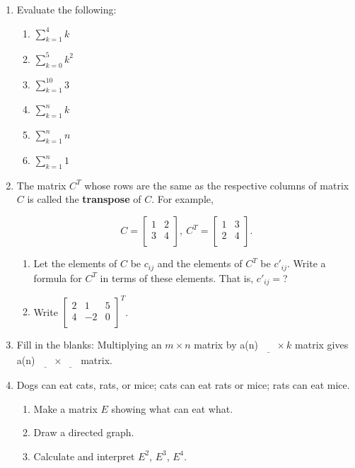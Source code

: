 \documentclass[../gatm.tex]{subfiles}
\begin{document}
\begin{enumerate}
\setcounter{enumi}{\value{mtrx_mult_problem_i}}
\item Evaluate the following:
\begin{multicols}{6}
\begin{enumerate}
\item $\displaystyle\sum_{k=1}^4 k$
\item $\displaystyle\sum_{k=0}^5 k^2$
\item $\displaystyle\sum_{k=1}^{10} 3$
\item $\displaystyle\sum_{k=1}^n k$
\item $\displaystyle\sum_{k=1}^n n$
\item $\displaystyle\sum_{k=1}^n 1$
\end{enumerate}
\end{multicols}

\item The matrix $C^T$ whose rows are the same as the respective columns of matrix $C$ is called the \textbf{transpose} of $C$. For example,

$$C=\left[\begin{array}{cc}
1 & 2 \\
3 & 4 \\
\end{array}\right],\: C^T=\left[\begin{array}{cc}
1 & 3 \\
2 & 4 \\
\end{array}\right].$$

\begin{enumerate}
\item Let the elements of $C$ be $c_{ij}$ and the elements of $C^T$ be $c'_{ij}$. Write a formula for $C^T$ in terms of these elements. That is, $c'_{ij} = $?
\item Write $\left[\begin{array}{ccc}
2 & 1 & 5 \\
4 & -2 & 0 \\
\end{array}\right]^T$.
\end{enumerate}
\item Fill in the blanks: Multiplying an $m\times n$ matrix by a(n) $\underline{\phantom{egg}} \times k$ matrix gives a(n) $\underline{\phantom{egg}}\times\underline{\phantom{egg}}$ matrix.
\item Dogs can eat cats, rats, or mice; cats can eat rats or mice; rats can eat mice.
\begin{enumerate}
\item Make a matrix $E$ showing what can eat what.
\item Draw a directed graph.
\item Calculate and interpret $E^2$, $E^3$, $E^4$.
\end{enumerate}
\setcounter{mtrx_mult_problem_i}{\value{enumi}}
\end{enumerate}
\end{document}
